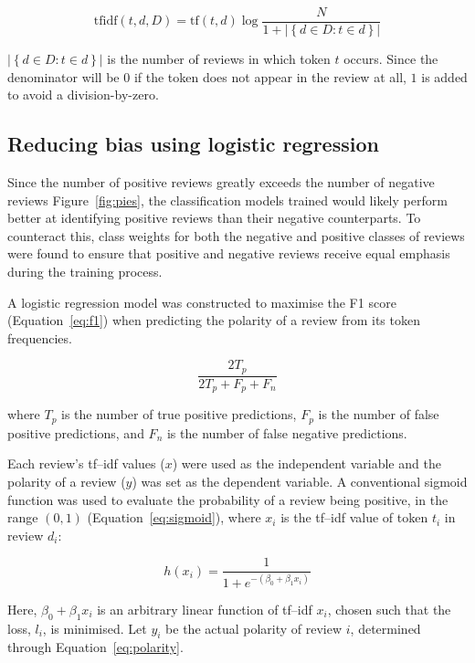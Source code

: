 \documentclass[12pt, a4paper]{pancake-article}
\begin{document}
\begin{equation}
	\text{tfidf}\left(t, d, D\right) = \text{tf}\left(t, d\right)\log\frac{N}{1 + \left|\left\{d \in D : t\in d\right\}\right|}
	\label{eq:tf-idf}
\end{equation}

\(\left|\left\{d \in D : t \in d\right\}\right|\) is the number of reviews in which token \(t\) occurs.
Since the denominator will be \(0\) if the token does not appear in the review at all, \(1\) is added
to avoid a division-by-zero.

\subsection{Reducing bias using logistic regression}

Since the number of positive reviews greatly exceeds the number of negative reviews Figure~\ref{fig:pies},
the classification models trained would likely perform better at identifying positive reviews than their
negative counterparts. To counteract this, class weights for both the negative and positive classes of reviews
were found to ensure that positive and negative reviews receive equal emphasis during the training process.

A logistic regression model was constructed to maximise the F1 score (Equation~\ref{eq:f1}) when
predicting the polarity of a review from its token frequencies.

\begin{equation}
	\frac{2 T_p}{2 T_p + F_p + F_n}
	\label{eq:f1}
\end{equation}

where $T_p$ is the number of true positive predictions, $F_p$ is the number of false positive predictions,
and $F_n$ is the number of false negative predictions.

Each review's tf--idf values ($x$) were used as the independent variable and the polarity of a review ($y$) was set
as the dependent variable. A conventional sigmoid function was used to evaluate the probability of a review being positive, in the range
\(\left(0, 1\right)\) (Equation~\ref{eq:sigmoid}), where \(x_i\) is the tf--idf value of token \(t_i\) in
review \(d_i\):

\begin{equation}
	h\left(x_i\right)	= \frac{1}{1 + e^{-\left(\beta_0 + \beta_1 x_i\right)}}
	\label{eq:sigmoid}
\end{equation}

Here, \(\beta_0 + \beta_1 x_i\) is an arbitrary linear function of tf--idf \(x_i\), chosen
such that the loss, \(l_i\), is minimised. Let \(y_i\) be the actual polarity of review \(i\),
determined through Equation~\ref{eq:polarity}.
\end{document}
